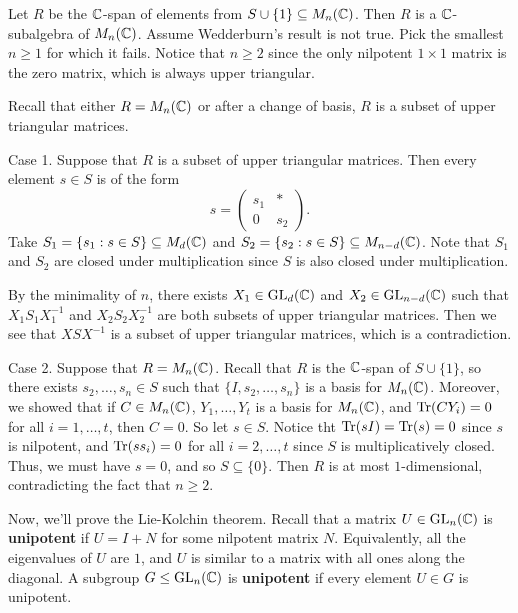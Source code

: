 \begin{pf}
    Let $R$ be the $\mathbb{C}$-span of elements from $S \cup \{1\} \subseteq M_n(\mathbb{C})$. 
    Then $R$ is a $\mathbb{C}$-subalgebra of $M_n(\mathbb{C})$. Assume Wedderburn's result is not 
    true. Pick the smallest $n \geq 1$ for which it fails. Notice that $n \geq 2$ 
    since the only nilpotent $1 \times 1$ matrix is the zero matrix, which is 
    always upper triangular. 

    Recall that either $R = M_n(\mathbb{C})$ or after a change of basis, $R$ is a subset of 
    upper triangular matrices. 

    {\sc Case 1.} Suppose that $R$ is a subset of upper triangular matrices. Then 
    every element $s \in S$ is of the form 
    \[ s = \begin{pmatrix}
        s_1 & * \\ 0 & s_2
    \end{pmatrix}. \] 
    Take $S_1 = \{s_1 : s \in S\} \subseteq M_d(\mathbb{C})$ and $S_2 = \{s_2 : s \in S\} 
    \subseteq M_{n-d}(\mathbb{C})$. Note that $S_1$ and $S_2$ are closed under multiplication 
    since $S$ is also closed under multiplication. 

    By the minimality of $n$, there exists $X_1 \in \operatorname{GL}_d(\mathbb{C})$ and $X_2 \in 
    \operatorname{GL}_{n-d}(\mathbb{C})$ such that $X_1S_1X_1^{-1}$ and $X_2S_2X_2^{-1}$ are both 
    subsets of upper triangular matrices. Then we see that $XSX^{-1}$ is a 
    subset of upper triangular matrices, which is a contradiction. 

    {\sc Case 2.} Suppose that $R = M_n(\mathbb{C})$. Recall that $R$ is the $\mathbb{C}$-span 
    of $S \cup \{1\}$, so there exists $s_2, \dots, s_n \in S$ such that 
    $\{I, s_2, \dots, s_n\}$ is a basis for $M_n(\mathbb{C})$. Moreover, we showed that 
    if $C \in M_n(\mathbb{C})$, $Y_1, \dots, Y_t$ is a basis for $M_n(\mathbb{C})$, and 
    $\operatorname{Tr}(CY_i) = 0$ for all $i = 1, \dots, t$, then $C = 0$. So let $s \in S$. 
    Notice tht $\operatorname{Tr}(sI) = \operatorname{Tr}(s) = 0$ since $s$ is nilpotent, and $\operatorname{Tr}(ss_i) = 0$
    for all $i = 2, \dots, t$ since $S$ is multiplicatively closed. Thus, 
    we must have $s = 0$, and so $S \subseteq \{0\}$. Then $R$ is at most 
    $1$-dimensional, contradicting the fact that $n \geq 2$. 
\end{pf}

Now, we'll prove the Lie-Kolchin theorem. Recall that a matrix $U \in \operatorname{GL}_n(\mathbb{C})$ 
is {\bf unipotent} if $U = I + N$ for some nilpotent matrix $N$. Equivalently, 
all the eigenvalues of $U$ are $1$, and $U$ is similar to a matrix with all 
ones along the diagonal. A subgroup $G \leq \operatorname{GL}_n(\mathbb{C})$ is {\bf unipotent} 
if every element $U \in G$ is unipotent. 

